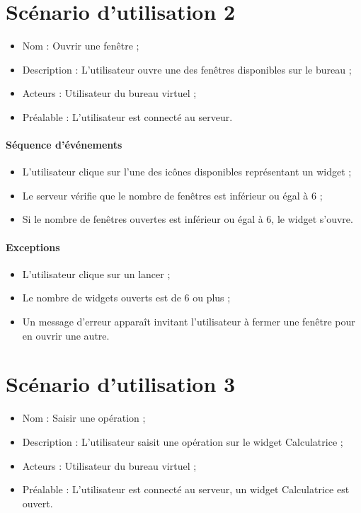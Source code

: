 
\section{Scénario d'utilisation 2}
\begin{itemize}
	\item Nom : Ouvrir une fenêtre ;
	\item Description : L'utilisateur ouvre une des fenêtres disponibles sur le bureau ;
	\item Acteurs : Utilisateur du bureau virtuel ;
	\item Préalable : L'utilisateur est connecté au serveur.
\end{itemize}

\paragraph{Séquence d'événements}
\begin{itemize}
	\item L'utilisateur clique sur l'une des icônes disponibles représentant un widget ;
	\item Le serveur vérifie que le nombre de fenêtres est inférieur ou égal à 6 ;
	\item Si le nombre de fenêtres ouvertes est inférieur ou égal à 6, le widget s'ouvre.
\end{itemize}

\paragraph{Exceptions}
\begin{itemize}
	\item L'utilisateur clique sur un lancer ;
	\item Le nombre de widgets ouverts est de 6 ou plus ;
	\item Un message d'erreur apparaît invitant l'utilisateur à fermer une fenêtre pour en ouvrir une autre.
\end{itemize}


\section{Scénario d'utilisation 3}
\begin{itemize}
	\item Nom : Saisir une opération ;
	\item Description : L'utilisateur saisit une opération sur le widget Calculatrice ;
	\item Acteurs : Utilisateur du bureau virtuel ;
	\item Préalable : L'utilisateur est connecté au serveur, un widget Calculatrice est ouvert.
\end{itemize}

